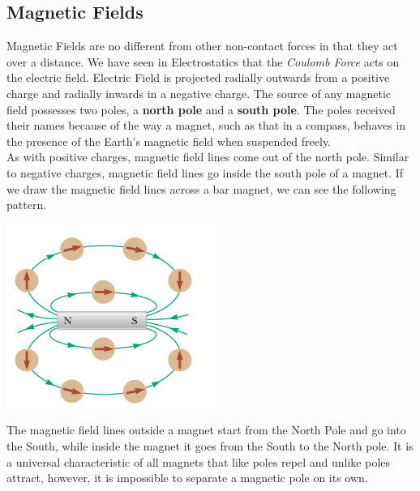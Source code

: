 \documentclass[9pt]{article}
\begin{document}
	\subsection*{Magnetic Fields}
	Magnetic Fields are no different from other non-contact forces in that they act over a distance. We have seen in Electrostatics that the \textit{Coulomb	Force} acts on the electric field. Electric Field is projected radially outwards from a positive charge and radially inwards in a negative charge. The source of any magnetic field possesses two poles, a \textbf{north pole} and a \textbf{south pole}. The poles received their names because of the way a magnet, such as that in a compass, behaves in the presence of the Earth’s magnetic field when suspended freely. \\ 
	As with positive charges, magnetic field lines come out of the north pole. Similar to negative charges, magnetic field lines go inside the south pole of a magnet. If we draw the magnetic field lines across a bar magnet, we can see the following pattern. \\
	\begin{center}
	\includegraphics[scale=0.5]{magnetic_field_bar.png}	
	\end{center}
	The magnetic field lines outside a magnet start from the North Pole and go into the South, while inside the magnet it goes from the South to the North pole. It is a universal characteristic of all magnets that like poles repel and unlike poles attract, however, it is impossible to separate a magnetic pole on its own. \\ \\
\end{document}
